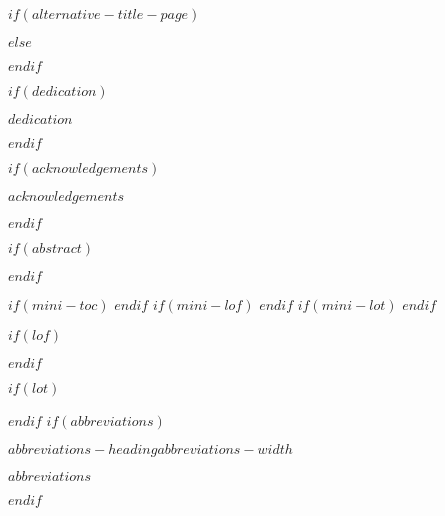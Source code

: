 \documentclass[a4paper, $if(page-layout)$$page-layout$$endif$]{templates/ociamthesis}
\begin{document}
\begin{romanpages}

$if(alternative-title-page)$

$else$
\maketitle
$endif$

$if(dedication)$
\begin{dedication}
  $dedication$
\end{dedication}
$endif$

$if(acknowledgements)$
\begin{acknowledgements}
 	$acknowledgements$
\end{acknowledgements}
$endif$


$if(abstract)$
\begin{abstract}
	$abstract$
\end{abstract}
$endif$

$if(mini-toc)$
  \dominitoc %
$endif$
$if(mini-lof)$
  \dominilof  %
$endif$
$if(mini-lot)$
  \dominilot  %
$endif$

\flushbottom

\tableofcontents

$if(lof)$
\listoffigures
	\mtcaddchapter
$endif$

$if(lot)$
\listoftables
  \mtcaddchapter
$endif$
$if(abbreviations)$
\begin{mclistof}{$abbreviations-heading$}{$abbreviations-width$}

$abbreviations$

\end{mclistof} 

$endif$

\end{romanpages}
\end{document}
